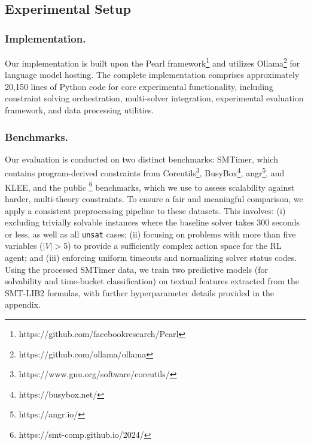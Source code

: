 \subsection{Experimental Setup}

\subsubsection{Implementation.} Our implementation is built upon the Pearl framework\footnote{https://github.com/facebookresearch/Pearl} and utilizes Ollama\footnote{https://github.com/ollama/ollama} for language model hosting. %
The complete implementation comprises approximately 20,150 lines of Python code for core experimental functionality, including constraint solving orchestration, multi-solver integration, experimental evaluation framework, and data processing utilities.

\subsubsection{Benchmarks.} Our evaluation is conducted on two distinct benchmarks: SMTimer\cite{luoBoostingSymbolicExecutionTime2021}, which contains program-derived constraints from Coreutils\footnote{https://www.gnu.org/software/coreutils/}, BusyBox\footnote{https://busybox.net/}, angr\footnote{https://angr.io/}, and KLEE, and the public \SMTCOMP{}\footnote{https://smt-comp.github.io/2024/} benchmarks, which we use to assess scalability against harder, multi-theory constraints\cite{BST10,klee,mechtaevSemanticProgramRepair2018}. To ensure a fair and meaningful comparison, we apply a consistent preprocessing pipeline to these datasets. This involves: (i) excluding trivially solvable instances where the baseline solver takes 300 seconds or less, as well as all \texttt{unsat} cases; (ii) focusing on problems with more than five variables ($|V|>5$) to provide a sufficiently complex action space for the RL agent; and (iii) enforcing uniform timeouts and normalizing solver status codes. Using the processed SMTimer data, we train two predictive models (for solvability and time-bucket classification) on textual features extracted from the SMT-LIB2 formulas, with further hyperparameter details provided in the appendix. 


